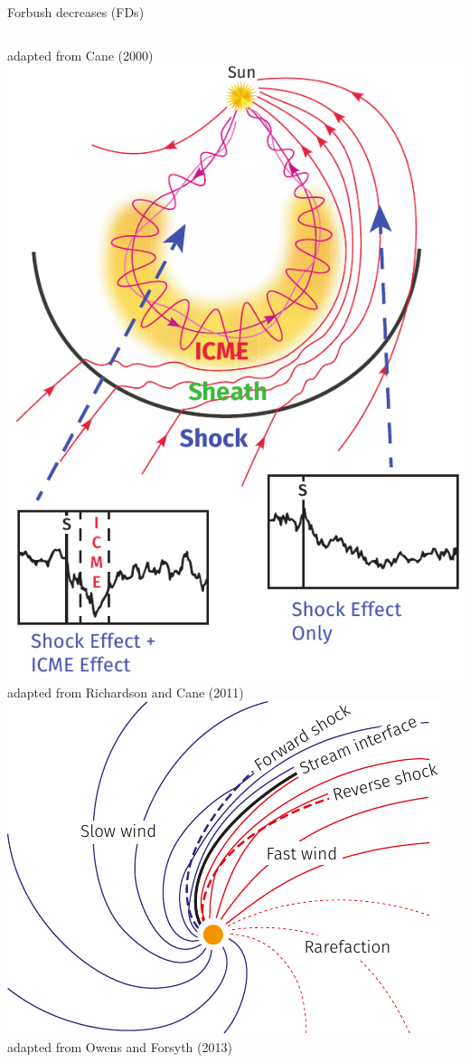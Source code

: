 \documentclass[10pt,aspectratio=169,usenames,dvipsnames]{beamer}
\begin{document}
\begin{frame}{Forbush decreases (FDs)}
\begin{columns}[t]
\begin{column}{0.35\textwidth}
\begin{overprint}
                \scriptsize adapted from Cane (2000)    
                \includegraphics[width=\textwidth]{images/RichardsonCane-adapted.pdf}
                \scriptsize adapted from Richardson and Cane (2011)    
                \vskip1cm
                \includegraphics[width=\textwidth]{images/Owens-Forsyth-adapted.pdf}
                \scriptsize adapted from Owens and Forsyth (2013)    
            \end{overprint}
        \end{column}
    \end{columns}
\end{frame}
\end{document}
